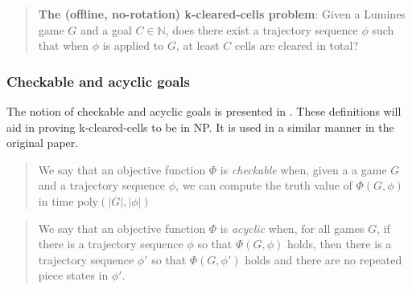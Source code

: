 \begin{quote}
\textbf{The (offline, no-rotation) k-cleared-cells problem}: Given a Lumines game $G$ and a goal $C \in \mathbb{N}$, does there exist a trajectory sequence $\phi$ such that when $\phi$ is applied to $G$, at least $C$ cells are cleared in total?
\end{quote}

\subsubsection{Checkable and acyclic goals}
The notion of checkable and acyclic goals is presented in \cite{tetris}. These definitions will aid in proving k-cleared-cells to be in NP. It is used in a similar manner in the original paper.

\begin{quote}
We say that an objective function $\Phi$ is \textit{checkable} when, given a a game $G$ and a trajectory sequence $\phi$, we can compute the truth value of $\Phi(G, \phi)$ in time $\text{poly}(|G|, |\phi|)$
\end{quote}

\begin{quote}
We say that an objective function $\Phi$ is \textit{acyclic} when, for all games $G$, if there is a trajectory sequence $\phi$ so that $\Phi(G, \phi)$ holds, then there is a trajectory sequence $\phi'$ so that $\Phi(G, \phi')$ holds and there are no repeated piece states in $\phi'$.
\end{quote}
